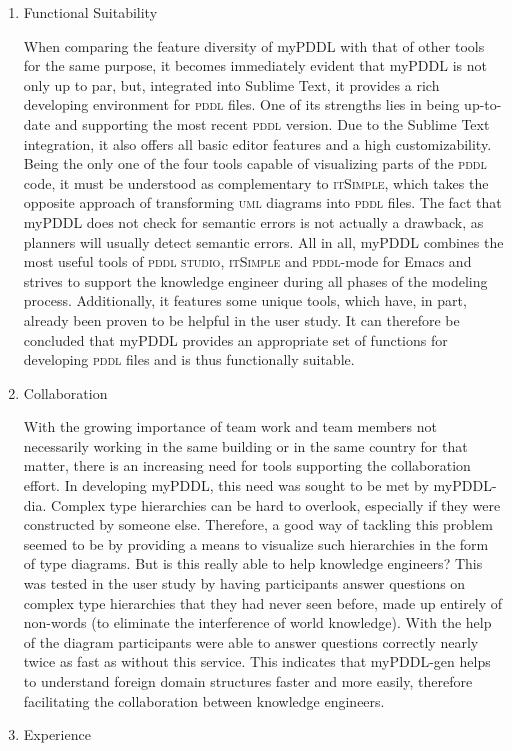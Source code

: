 \documentclass[a4paper,12pt]{report}
\newcommand{\mypddl}{\smallerft[0.8]{myPDDL}\xspace}
\newcommand{\pddlstudio}{\textsc{pddl studio}\xspace}
\newcommand{\itsimple}{\textsc{itSimple}\xspace}
\newcommand{\pddlmode}{\textsc{pddl}-mode\xspace}
\newcommand{\pddl}{\textsc{pddl}\xspace}
\newcommand\smallerft[2][0.85]{{\scalefont{#1}#2}}
\begin{document}
\begin{enumerate}
\item Functional Suitability
\label{sec-5-3-0-1}

When comparing the feature diversity of \mypddl with that of other
tools for the same purpose, it becomes immediately evident that
\mypddl is not only up to par, but, integrated into Sublime Text, it
provides a rich developing environment for \pddl files. One of its
strengths lies in being up-to-date and supporting the most recent
\pddl version. Due to the Sublime Text integration, it also offers all
basic editor features and a high customizability. Being the only one
of the four tools capable of visualizing parts of the \pddl code, it
must be understood as complementary to \itsimple, which takes the
opposite approach of transforming \textsc{uml} diagrams into \pddl
files. The fact that \mypddl does not check for semantic errors is not
actually a drawback, as planners will usually detect semantic errors.
All in all, \mypddl combines the most useful tools of \pddlstudio,
\itsimple and \pddlmode for Emacs and strives to support the knowledge
engineer during all phases of the modeling process. Additionally, it
features some unique tools, which have, in part, already been proven
to be helpful in the user study. It can therefore be concluded that
\mypddl provides an appropriate set of functions for developing \pddl
files and is thus functionally suitable.
\item Collaboration
\label{sec-5-3-0-2}

With the growing importance of team work and team members not
necessarily working in the same building or in the same country for
that matter, there is an increasing need for tools supporting the
collaboration effort. In developing \mypddl, this need was sought to
be met by \mypddl-dia. Complex type hierarchies can be hard to
overlook, especially if they were constructed by someone else.
Therefore, a good way of tackling this problem seemed to be by
providing a means to visualize such hierarchies in the form of type
diagrams. But is this really able to help knowledge engineers? This
was tested in the user study by having participants answer questions
on complex type hierarchies that they had never seen before, made up
entirely of non-words (to eliminate the interference of world
knowledge). With the help of the diagram participants were able to
answer questions correctly nearly twice as fast as without this
service. This indicates that \mypddl-gen helps to understand foreign
domain structures faster and more easily, therefore facilitating the
collaboration between knowledge engineers.
\item Experience
\label{sec-5-3-0-3}


\end{enumerate}
\end{document}
